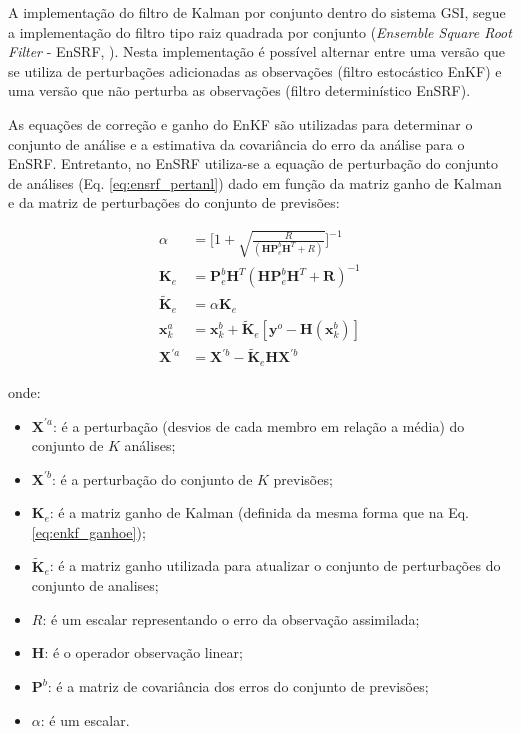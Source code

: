 A implementação do filtro de Kalman por conjunto dentro do sistema GSI, segue a implementação do filtro tipo raiz quadrada por conjunto (\textit{Ensemble Square Root Filter} - EnSRF, ). Nesta implementação é possível alternar entre uma versão que se utiliza de perturbações adicionadas as observações (filtro estocástico EnKF) e uma versão que não perturba as observações (filtro determinístico EnSRF).

As equações de correção e ganho do EnKF são utilizadas para determinar o conjunto de análise e a estimativa da covariância do erro da análise para o EnSRF. Entretanto, no EnSRF utiliza-se a equação de perturbação do conjunto de análises (Eq. \ref{eq:ensrf_pertanl}) dado em função da matriz ganho de Kalman e da matriz de perturbações do conjunto de previsões:

\begin{align}
    \label{eq:ensrf_alpha}
    \alpha & = \Bigg[ 1 + \sqrt{\frac{R}{(\mathbf{H}\mathbf{P}^{b}_{e}\mathbf{H}^{T} + R)}}\Bigg]^{-1} \\
    \label{eq:ensrf_ganhoe}
    \mathbf{K}_{e} & = {\mathbf{P}^{b}_{e}}\mathbf{H}^{T}({\mathbf{H}\mathbf{P}^{b}_{e}}\mathbf{H}^{T}+\mathbf{R})^{-1} \\
    \label{eq:ensrf_ganhopert} 
    \mathbf{\tilde{K}}_{e} & = \alpha \mathbf{K}_{e} \\
    \label{eq:ensrf_anle}
    \mathbf{x}^{a}_{k} & = {\mathbf{x}^{b}_{k}} + \mathbf{\tilde{K}}_{e}[\mathbf{y}^{o}-{\mathbf{H}(\mathbf{x}^{b}_{k})}] \\
    \label{eq:ensrf_pertanl}
    \mathbf{X}^{\prime{a}} & = \mathbf{X}^{\prime{b}} - \mathbf{\tilde{K}}_{e} \mathbf{H} \mathbf{X}^{\prime{b}}
\end{align}
    
onde:

\begin{itemize}
    \item $\mathbf{X}^{\prime{a}}$: é a perturbação (desvios de cada membro em relação a média) do conjunto de $K$ análises;
    \item $\mathbf{X}^{\prime{b}}$: é a perturbação do conjunto de $K$ previsões;
    \item $\mathbf{K}_{e}$: é a matriz ganho de Kalman (definida da mesma forma que na Eq. \ref{eq:enkf_ganhoe});
    \item $\mathbf{\tilde{K}}_{e}$: é a matriz ganho utilizada para atualizar o conjunto de perturbações do conjunto de analises;
    \item $R$: é um escalar representando o erro da observação assimilada;
    \item $\mathbf{H}$: é o operador observação linear;
    \item $\mathbf{P}^{b}$: é a matriz de covariância dos erros do conjunto de previsões;
    \item $\alpha$: é um escalar.
\end{itemize}

